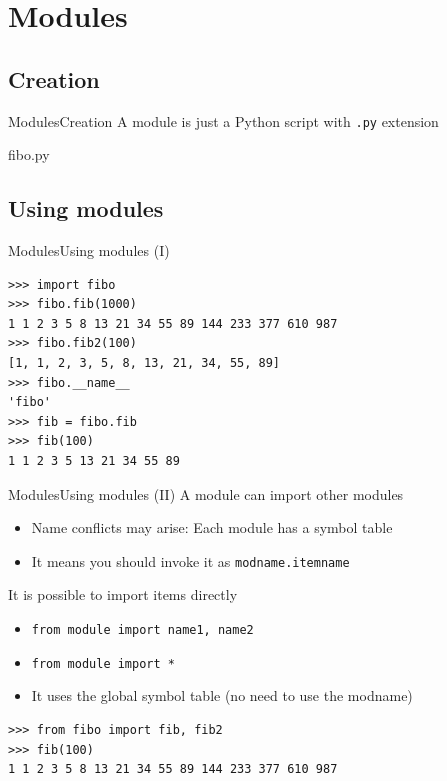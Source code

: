 \documentclass[10pt,compress]{beamer} %
\begin{document}
\section{Modules}
\subsection{Creation}

\begin{frame}[fragile]{Modules}{Creation}
	\vspace{-0.2cm}
	A module is just a Python script with \texttt{.py} extension
	\vspace{-0.2cm}
	\begin{exampleblock}{fibo.py}
	\vspace{-0.2cm}
	
	\vspace{-0.2cm}
	\end{exampleblock}
\end{frame}

\subsection{Using modules}

\begin{frame}[fragile]{Modules}{Using modules (I)}
	\begin{exampleblock}{}
	\begin{verbatim}
>>> import fibo
>>> fibo.fib(1000)
1 1 2 3 5 8 13 21 34 55 89 144 233 377 610 987
>>> fibo.fib2(100)
[1, 1, 2, 3, 5, 8, 13, 21, 34, 55, 89]
>>> fibo.__name__
'fibo'
>>> fib = fibo.fib
>>> fib(100)
1 1 2 3 5 13 21 34 55 89
\end{verbatim}
	\vspace{-0.2cm}
	\end{exampleblock}
\end{frame}

\begin{frame}[fragile]{Modules}{Using modules (II)}
	A module can import other modules
		\begin{itemize}
		\item Name conflicts may arise: Each module has a symbol table
		\item It means you should invoke it as \texttt{modname.itemname}
		\end{itemize}
 	It is possible to import items directly
		\begin{itemize}
		\item \texttt{from module import name1, name2}
		\item \texttt{from module import *}
		\item It uses the global symbol table (no need to use the modname)
			\end{itemize}
	
	\begin{exampleblock}{}
	\begin{verbatim}
>>> from fibo import fib, fib2
>>> fib(100)
1 1 2 3 5 8 13 21 34 55 89 144 233 377 610 987
\end{verbatim}
	\end{exampleblock}
\end{frame}
\end{document}
